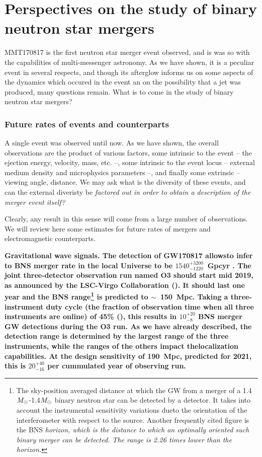 
\part{Perspectives on the study of binary neutron star mergers}

MMT170817 is the first neutron star merger event observed, and is was so with the capabilities of multi-messenger astronomy. As we have shown, it is a peculiar event in several respects, and though its afterglow informs us on some aspects of the dynamics which occured in the event an on the possibility that a jet was produced, many questions remain. What is to come in the study of binary neutron star mergers?

\section{Future rates of events and counterparts}

A single event was observed until now. As we have shown, the overall observations are the product of various factors, some intrinsic to the event -- the ejection energy, velocity, mass, etc. --, some intrinsic to the event locus -- external medium density and microphysics parameters --, and finally some extrinsic -- viewing angle, distance. We may ask what is the diversity of these events, and can the external diveristy be \it{factored out} in order to obtain a description of the merger event itself?

Clearly, any result in this sense will come from a large number of observations. We will review here some estimates for future rates of mergers and electromagnetic counterparts.

\bf{Gravitational wave signals.} The detection of GW170817 allowsto infer to BNS merger rate in the local Universe to be $1540^{+3200}_{-1220}$~Gpcyr \cite{37}. The joint three-detector observation run named O3  should start mid 2019, as announced by the LSC-Virgo Collaboration (\cite{54}). It should last one year and the BNS range\footnote{The sky-position averaged distance at which the GW from a merger of a 1.4$M_{\odot}$-1.4$M_{\odot}$ binary neutron star can be detected by a detector. It takes into account the instrumental sensitivity variations dueto the orientation of the interferometer with respect to the source. Another frequently cited figure is the BNS \it{horizon}, which is the distance to which an  optimally oriented such binary merger can be detected. The range is 2.26 times lower than the horizon.} is predicted to $\sim$~150~Mpc. Taking a three-instrument duty cycle (the fraction of observation time when all three instruments are online) of 45\% (\cite{54}), this results in $10^{+20}_{-8}$ BNS merger GW detections during the O3 run. As we have already described, the detection range is determined by the largest range of the three instruments, while the ranges of the others impact thelocalization capabilities.
At the design sensitivity of 190~Mpc, predicted for 2021, this is $20^{+40}_{-16}$ per cummulated year of observing run.

